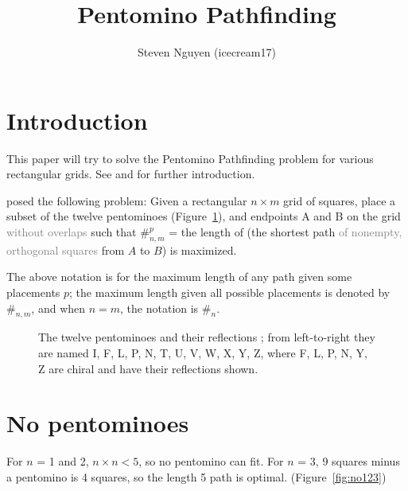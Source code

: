 \documentclass{article}
\title{Pentomino Pathfinding}
\author{Steven Nguyen (icecream17)}
\theoremstyle{definition}%
\newcommand{\minordetail}[1]{\textcolor{gray}{#1}}
\begin{document}
\maketitle


\tableofcontents





\section{Introduction}

This paper will try to solve the Pentomino Pathfinding problem for various rectangular grids. See \cite{v1} and \cite{v2} for further introduction.

\cite{v1} posed the following problem: Given a rectangular $n \times m$ grid of squares, place a subset of the twelve pentominoes (Figure~\ref{fig:pentominoes}), and endpoints A and B on the grid \minordetail{without overlaps} such that $\#^{p}_{n, m}$ = the length of (the shortest path \minordetail{of nonempty, orthogonal squares} from $A$ to $B$) is maximized.

The above notation is for the maximum length of any path given some placements $p$; the maximum length given all possible placements is denoted by $\#_{n, m}$, and when $n = m$, the notation is $\#_n$.

\begin{figure}[htbp]
    \centering
    
    \caption{The twelve pentominoes and their reflections \cite{pentominoes};
    from left-to-right they are named I, F, L, P, N, T, U, V, W, X, Y, Z,
    where F, L, P, N, Y, Z are chiral and have their reflections shown.}
    \label{fig:pentominoes}
\end{figure}






\section{No pentominoes}

For $n$ = 1 and 2, $n \times n < 5$, so no pentomino can fit.
For $n$ = 3, 9 squares minus a pentomino is 4 squares, so the length 5 path is optimal. (Figure~\ref{fig:no123})
\end{document}
